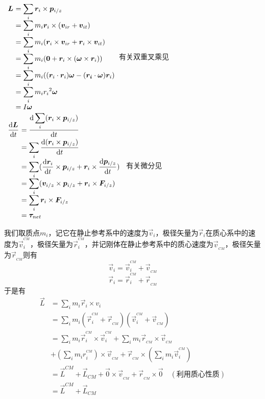 \begin{prove}[Angular Momentum\qquad$\displaystyle\vec{L}=\sum_i\vec{r}_i\times\vec{p}_{i/z}=I\vec{\omega}\quad\&\quad\dfrac{\dif \vec{L}}{\dif t}=\vec{\tau}$]
	\qquad
	$
	\begin{array}{r@{\ }l}
		\vec{L}&=\displaystyle\sum_i\vec{r}_i\times\vec{p}_{i/z}\\
		&=\displaystyle\sum_im_i\vec{r}_i\times(\vec{v}_{ir}+\vec{v}_{it})\\
		&=\displaystyle\sum_im_i(\vec{r}_i\times\vec{v}_{ir}+\vec{r}_i\times\vec{v}_{it})\\
		&=\displaystyle\sum_im_i(\vec{0}+\vec{r}_i\times(\vec{\omega}\times\vec{r}_i))\\
		&=\displaystyle\sum_im_i((\vec{r}_i\cdot\vec{r}_i)\vec{\omega}-(\vec{r_i}\cdot\vec{\omega})\vec{r}_i)\\
		&=\displaystyle\sum_im_ir_i{}^2\vec{\omega}\\
		&=I\vec{\omega}
	\end{array}$有关双重叉乘见
	\\[2ex]
	\hspace*{0.9em}
	$
	\begin{array}{r@{\ }l}
		\dfrac{\dif\vec{L}}{\dif t}&=\dfrac{\dif\displaystyle\sum_i(\vec{r}_i\times\vec{p}_{i/z})}{\dif t}\\[1.4ex]
		&=\displaystyle\sum_i\dfrac{\dif(\vec{r}_i\times\vec{p}_{i/z})}{\dif t}\\
		&=\displaystyle\sum_i(\dfrac{\dif\vec{r}_i}{\dif t}\times\vec{p}_{i/z}+\vec{r}_i\times\dfrac{\dif\vec{p}_{i/z}}{\dif t})\\
		&=\displaystyle\sum_i(\vec{v}_{i/z}\times\vec{p}_{i/z}+\vec{r}_i\times\vec{F}_{i/z})\\
		&=\displaystyle\sum_i\vec{r}_i\times\vec{F}_{i/z}\\
		&=\vec{\tau}_{net}
	\end{array}$
	有关微分见
\end{prove}
\begin{prove}[$\vec{L}=\vec{L}_{CM}+\vec{L}^{CM}$]
	我们取质点$m_i$，记它在静止参考系中的速度为$\vec{v}_i$，极径矢量为$\vec{r}_i$在质心系中的速度为$\vec{v}^{^{CM}}_i$，极径矢量为$\vec{r}_i^{^{CM}}$，并记刚体在静止参考系中的质心速度为$\vec{v}_{_{CM}}$，极径矢量为$\vec{r}_{_{CM}}$则有
	\[\vec{v}_i=\vec{v}_i^{^{CM}}+\vec{v}_{_{CM}}\]
	\[\vec{r}_i=\vec{r}_i^{^{CM}}+\vec{r}_{_{CM}}\]
	于是有
	\begin{align*}
		\vec{L}&=\sum_im_i\vec{r}_i\times v_i\\
		&=\sum_im_i(\vec{r}_i^{^{CM}}+\vec{r}_{_{CM}})(\vec{v}_i^{^{CM}}+\vec{v}_{_{CM}})\\
		&=\sum_im_i\vec{r}_i^{^{CM}}\times\vec{v}_i^{^{CM}}+\sum_im_i\vec{r}_{_{CM}}\times\vec{v}_{_{CM}}\\
		&+(\sum_im_ir_i^{^{CM}})\times\vec{v}_{_{CM}}+\vec{r}_{_{CM}}\times(\sum_im_i\vec{v}_i^{^{CM}})\\
		&=\vec{L}^{CM}+\vec{L}_{CM}+\vec{0}\times\vec{v}_{_{CM}}+\vec{r}_{_{CM}}\times\vec{0}\quad(\text{利用质心性质})\\
		&=\vec{L}^{CM}+\vec{L}_{CM}
	\end{align*}
\end{prove}
